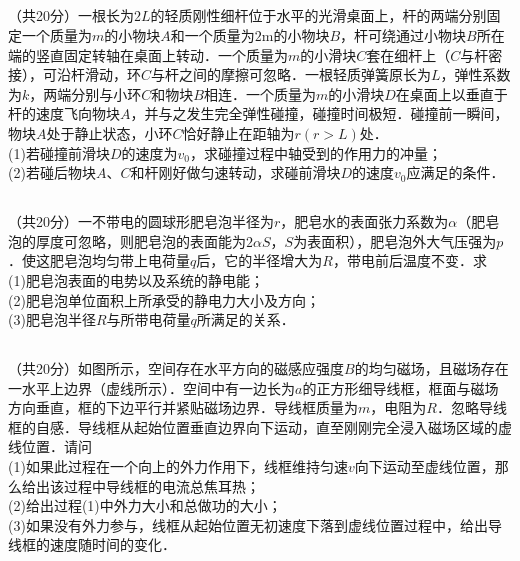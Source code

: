 \subsection{ }
（共20分）一根长为$2L$的轻质刚性细杆位于水平的光滑桌面上，杆的两端分别固定一个质量为$m$的小物块$A$和一个质量为$2\mathrm{m}$的小物块$B$，杆可绕通过小物块$B$所在端的竖直固定转轴在桌面上转动．一个质量为$m$的小滑块$C$套在细杆上（$C$与杆密接），可沿杆滑动，环$C$与杆之间的摩擦可忽略．一根轻质弹簧原长为$L$，弹性系数为$k$，两端分别与小环$C$和物块$B$相连．一个质量为$m$的小滑块$D$在桌面上以垂直于杆的速度飞向物块$A$，并与之发生完全弹性碰撞，碰撞时间极短．碰撞前一瞬间，物块$A$处于静止状态，小环$C$恰好静止在距轴为$r(r>L)$处．\\
(1)若碰撞前滑块$D$的速度为$v_{0}$，求碰撞过程中轴受到的作用力的冲量；\\
(2)若碰后物块$A$、$C$和杆刚好做匀速转动，求碰前滑块$D$的速度$v_{0}$应满足的条件．\\
\subsection{ }
（共20分）一不带电的圆球形肥皂泡半径为$r$，肥皂水的表面张力系数为$\alpha$（肥皂泡的厚度可忽略，则肥皂泡的表面能为$2 \alpha S$，$S$为表面积），肥皂泡外大气压强为$p$．使这肥皂泡均匀带上电荷量$q$后，它的半径增大为$R$，带电前后温度不变．求\\
(1)肥皂泡表面的电势以及系统的静电能；\\
(2)肥皂泡单位面积上所承受的静电力大小及方向；\\
(3)肥皂泡半径$R$与所带电荷量$q$所满足的关系．\\
\subsection{ }
（共20分）如图所示，空间存在水平方向的磁感应强度$B$的均匀磁场，且磁场存在一水平上边界（虚线所示）．空间中有一边长为$a$的正方形细导线框，框面与磁场方向垂直，框的下边平行并紧贴磁场边界．导线框质量为$m$，电阻为$R$．忽略导线框的自感．导线框从起始位置垂直边界向下运动，直至刚刚完全浸入磁场区域的虚线位置．请问\\
(1)如果此过程在一个向上的外力作用下，线框维持匀速$v$向下运动至虚线位置，那么给出该过程中导线框的电流总焦耳热；\\
(2)给出过程(1)中外力大小和总做功的大小；\\
(3)如果没有外力参与，线框从起始位置无初速度下落到虚线位置过程中，给出导线框的速度随时间的变化．

